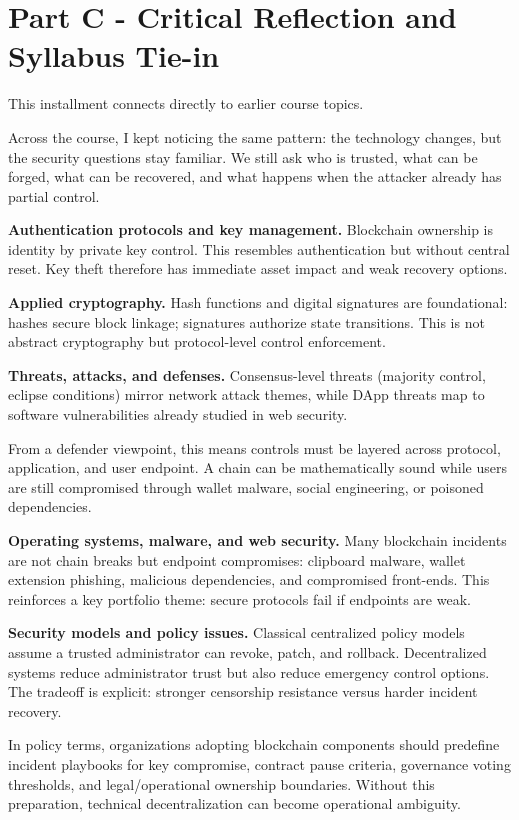 \documentclass[10pt,a4paper]{article}
\begin{document}
\section*{Part C - Critical Reflection and Syllabus Tie-in}
This installment connects directly to earlier course topics.

Across the course, I kept noticing the same pattern: the technology changes, but the security questions stay familiar. We still ask who is trusted, what can be forged, what can be recovered, and what happens when the attacker already has partial control.

\textbf{Authentication protocols and key management.}
Blockchain ownership is identity by private key control. This resembles authentication but without central reset. Key theft therefore has immediate asset impact and weak recovery options.

\textbf{Applied cryptography.}
Hash functions and digital signatures are foundational: hashes secure block linkage; signatures authorize state transitions. This is not abstract cryptography but protocol-level control enforcement.

\textbf{Threats, attacks, and defenses.}
Consensus-level threats (majority control, eclipse conditions) mirror network attack themes, while DApp threats map to software vulnerabilities already studied in web security.

From a defender viewpoint, this means controls must be layered across protocol, application, and user endpoint. A chain can be mathematically sound while users are still compromised through wallet malware, social engineering, or poisoned dependencies.

\textbf{Operating systems, malware, and web security.}
Many blockchain incidents are not chain breaks but endpoint compromises: clipboard malware, wallet extension phishing, malicious dependencies, and compromised front-ends. This reinforces a key portfolio theme: secure protocols fail if endpoints are weak.

\textbf{Security models and policy issues.}
Classical centralized policy models assume a trusted administrator can revoke, patch, and rollback. Decentralized systems reduce administrator trust but also reduce emergency control options. The tradeoff is explicit: stronger censorship resistance versus harder incident recovery.

In policy terms, organizations adopting blockchain components should predefine incident playbooks for key compromise, contract pause criteria, governance voting thresholds, and legal/operational ownership boundaries. Without this preparation, technical decentralization can become operational ambiguity.
\end{document}
